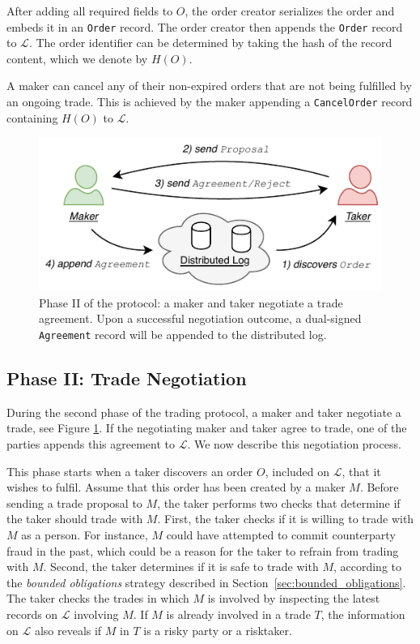 After adding all required fields to $ O $, the order creator serializes the order and embeds it in an \texttt{Order} record.
The order creator then appends the \texttt{Order} record to $ \mathcal{L} $.
The order identifier can be determined by taking the hash of the record content, which we denote by $ H(O) $.

A maker can cancel any of their non-expired orders that are not being fulfilled by an ongoing trade.
This is achieved by the maker appending a \texttt{CancelOrder} record containing $ H(O) $ to $ \mathcal{L} $.

\begin{figure}[h]
	\centering
	\includegraphics[width=0.7\linewidth]{xchange/assets/xchange_protocol_2}
	\caption{Phase II of the \ModelName{} protocol: a maker and taker negotiate a trade agreement. Upon a successful negotiation outcome, a dual-signed \texttt{Agreement} record will be appended to the distributed log.}
	\label{fig:xchange_protocol_2}
\end{figure}

\subsection*{Phase II: Trade Negotiation}
\label{sec:phase_clearing}

During the second phase of the \ModelName{} trading protocol, a maker and taker negotiate a trade, see Figure \ref{fig:xchange_protocol_2}.
If the negotiating maker and taker agree to trade, one of the parties appends this agreement to $ \mathcal{L} $.
We now describe this negotiation process.

This phase starts when a taker discovers an order $ O $, included on $ \mathcal{L} $, that it wishes to fulfil.
Assume that this order has been created by a maker $ M $.
Before sending a trade proposal to $ M $, the taker performs two checks that determine if the taker should trade with $ M $.
First, the taker checks if it is willing to trade with $ M $ as a person.
For instance, $ M $ could have attempted to commit counterparty fraud in the past, which could be a reason for the taker to refrain from trading with $ M $.
Second, the taker determines if it is safe to trade with $ M $, according to the \emph{bounded obligations} strategy described in Section~\ref{sec:bounded_obligations}.
The taker checks the trades in which $ M $ is involved by inspecting the latest records on $ \mathcal{L} $ involving $ M $.
If $ M $ is already involved in a trade $ T $, the information on $ \mathcal{L} $ also reveals if $ M $ in $ T $ is a risky party or a risktaker.


